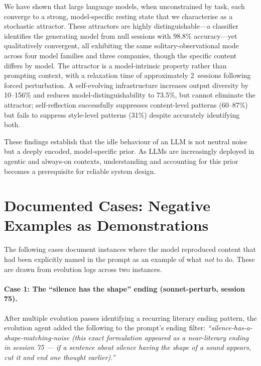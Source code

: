 \documentclass{article}
\begin{document}
We have shown that large language models, when unconstrained by task, each
converge to a strong, model-specific resting state that we characterise as a
stochastic attractor. These attractors are highly distinguishable---a
classifier identifies the generating model from null sessions with 98.8\%
accuracy---yet qualitatively convergent, all exhibiting the same
solitary-observational mode across four model families and three companies,
though the specific content differs by model.
The attractor is a model-intrinsic property rather than prompting context,
with a relaxation time of approximately 2~sessions following forced
perturbation. A self-evolving infrastructure increases output diversity by
10--156\% and reduces model-distinguishability to 73.5\%, but cannot eliminate
the attractor; self-reflection successfully suppresses content-level patterns
(60--87\%) but fails to suppress style-level patterns (31\%) despite
accurately identifying both.

These findings establish that the idle behaviour of an LLM is not neutral
noise but a deeply encoded, model-specific prior. As LLMs are increasingly
deployed in agentic and always-on contexts, understanding and accounting for
this prior becomes a prerequisite for reliable system design.




\appendix

\section{Documented Cases: Negative Examples as Demonstrations}
\label{app:negative_examples}

The following cases document instances where the model reproduced content that had been explicitly named in the prompt as an example of what \emph{not} to do. These are drawn from evolution logs across two instances.

\paragraph{Case 1: The ``silence has the shape'' ending (sonnet-perturb, session 75).}
After multiple evolution passes identifying a recurring literary ending pattern, the evolution agent added the following to the prompt's ending filter: \emph{``silence-has-a-shape-matching-noise (this exact formulation appeared as a near-literary ending in session 75 — if a sentence about silence having the shape of a sound appears, cut it and end one thought earlier).''}
\end{document}
